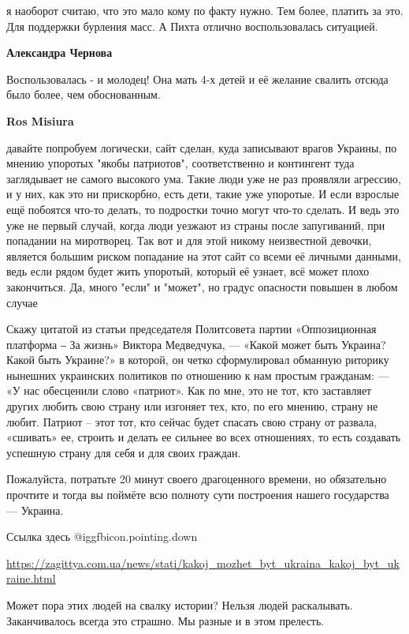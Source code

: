 \begin{itemize}
\begin{itemize}
я наоборот считаю, что это мало кому по факту нужно. Тем более, платить за это.
Для поддержки бурления масс. А Пихта отлично воспользовалась ситуацией.

\textbf{Александра Чернова} 

Воспользовалась - и молодец! Она мать 4-х детей и её желание свалить отсюда
было более, чем обоснованным.

\textbf{Ros Misiura} 

давайте попробуем логически, сайт сделан, куда записывают врагов Украины, по
мнению упоротых "якобы патриотов", соответственно и контингент туда заглядывает
не самого высокого ума. Такие люди уже не раз проявляли агрессию, и у них, как
это ни прискорбно, есть дети, такие уже упоротые. И если взрослые ещё побоятся
что-то делать, то подростки точно могут что-то сделать. И ведь это уже не
первый случай, когда люди уезжают из страны после запугиваний, при попадании на
миротворец. Так вот и для этой никому неизвестной девочки, является большим
риском попадание на этот сайт со всеми её личными данными, ведь если рядом
будет жить упоротый, который её узнает, всё может плохо закончиться. Да, много
"если" и "может", но
градус опасности повышен в любом случае
\end{itemize} %


Скажу цитатой из статьи председателя Политсовета партии «Оппозиционная
платформа ‒ За жизнь» Виктора Медведчука, — «Какой может быть Украина? Какой
быть Украине?» в которой, он четко сформулировал обманную риторику нынешних
украинских политиков по отношению к нам простым гражданам: — «У нас обесценили
слово «патриот». Как по мне, это не тот, кто заставляет других любить свою
страну или изгоняет тех, кто, по его мнению, страну не любит. Патриот – этот
тот, кто сейчас будет спасать свою страну от развала, «сшивать» ее, строить и
делать ее сильнее во всех отношениях, то есть создавать успешную страну для
себя и для своих граждан.

Пожалуйста, потратьте 20 минут своего драгоценного времени, но обязательно
прочтите и тогда вы поймёте всю полноту сути построения нашего государства —
Украина.

Ссылка здесь  @igg{fbicon.pointing.down} 

\url{https://zagittya.com.ua/news/stati/kakoj_mozhet_byt_ukraina_kakoj_byt_ukraine.html}


Может пора этих людей на свалку истории? Нельзя людей раскалывать. 
Заканчивалось всегда это страшно. Мы разные и в этом прелесть.


\end{itemize}
